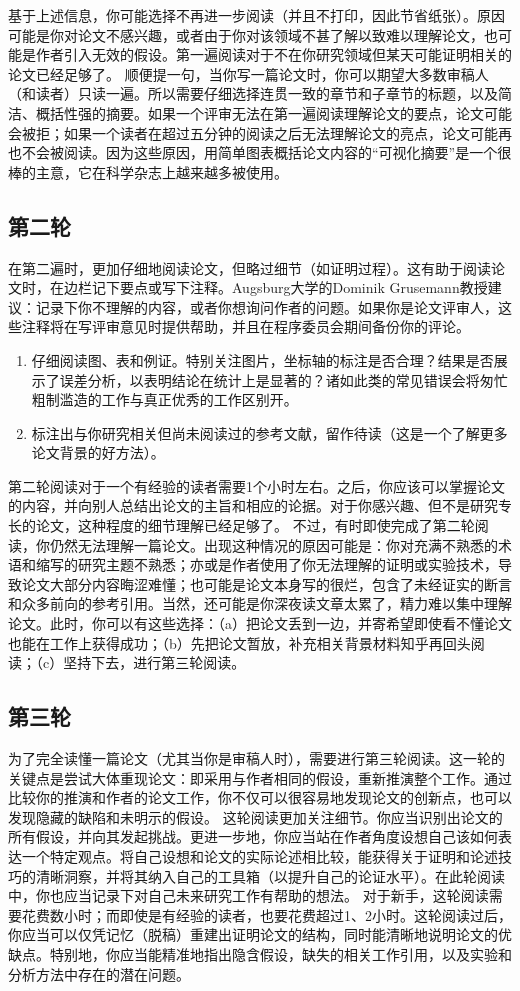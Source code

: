 \documentclass[a4paper,twocolumn]{article}
\begin{document}
		基于上述信息，你可能选择不再进一步阅读（并且不打印，因此节省纸张）。原因可能是你对论文不感兴趣，或者由于你对该领域不甚了解以致难以理解论文，也可能是作者引入无效的假设。第一遍阅读对于不在你研究领域但某天可能证明相关的论文已经足够了。
		顺便提一句，当你写一篇论文时，你可以期望大多数审稿人（和读者）只读一遍。所以需要仔细选择连贯一致的章节和子章节的标题，以及简洁、概括性强的摘要。如果一个评审无法在第一遍阅读理解论文的要点，论文可能会被拒；如果一个读者在超过五分钟的阅读之后无法理解论文的亮点，论文可能再也不会被阅读。因为这些原因，用简单图表概括论文内容的“可视化摘要”是一个很棒的主意，它在科学杂志上越来越多被使用。
		
		\subsection{第二轮}
		在第二遍时，更加仔细地阅读论文，但略过细节（如证明过程）。这有助于阅读论文时，在边栏记下要点或写下注释。Augsburg大学的Dominik Grusemann教授建议：记录下你不理解的内容，或者你想询问作者的问题。如果你是论文评审人，这些注释将在写评审意见时提供帮助，并且在程序委员会期间备份你的评论。
		\begin{enumerate}
			\item 仔细阅读图、表和例证。特别关注图片，坐标轴的标注是否合理？结果是否展示了误差分析，以表明结论在统计上是显著的？诸如此类的常见错误会将匆忙粗制滥造的工作与真正优秀的工作区别开。
			\item 标注出与你研究相关但尚未阅读过的参考文献，留作待读（这是一个了解更多论文背景的好方法）。
		\end{enumerate}
		第二轮阅读对于一个有经验的读者需要1个小时左右。之后，你应该可以掌握论文的内容，并向别人总结出论文的主旨和相应的论据。对于你感兴趣、但不是研究专长的论文，这种程度的细节理解已经足够了。
		不过，有时即使完成了第二轮阅读，你仍然无法理解一篇论文。出现这种情况的原因可能是：你对充满不熟悉的术语和缩写的研究主题不熟悉；亦或是作者使用了你无法理解的证明或实验技术，导致论文大部分内容晦涩难懂；也可能是论文本身写的很烂，包含了未经证实的断言和众多前向的参考引用。当然，还可能是你深夜读文章太累了，精力难以集中理解论文。此时，你可以有这些选择：（a）把论文丢到一边，并寄希望即使看不懂论文也能在工作上获得成功；（b）先把论文暂放，补充相关背景材料知乎再回头阅读；（c）坚持下去，进行第三轮阅读。

		\subsection{第三轮}
		为了完全读懂一篇论文（尤其当你是审稿人时），需要进行第三轮阅读。这一轮的关键点是尝试大体重现论文：即采用与作者相同的假设，重新推演整个工作。通过比较你的推演和作者的论文工作，你不仅可以很容易地发现论文的创新点，也可以发现隐藏的缺陷和未明示的假设。
		这轮阅读更加关注细节。你应当识别出论文的所有假设，并向其发起挑战。更进一步地，你应当站在作者角度设想自己该如何表达一个特定观点。将自己设想和论文的实际论述相比较，能获得关于证明和论述技巧的清晰洞察，并将其纳入自己的工具箱（以提升自己的论证水平）。在此轮阅读中，你也应当记录下对自己未来研究工作有帮助的想法。
		对于新手，这轮阅读需要花费数小时；而即使是有经验的读者，也要花费超过1、2小时。这轮阅读过后，你应当可以仅凭记忆（脱稿）重建出证明论文的结构，同时能清晰地说明论文的优缺点。特别地，你应当能精准地指出隐含假设，缺失的相关工作引用，以及实验和分析方法中存在的潜在问题。	
		
\end{document}
